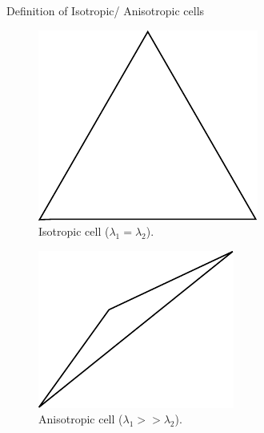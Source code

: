 \begin{frame}

  \begin{block}{Definition of Isotropic/ Anisotropic cells}
\begin{multicols}{2}
  \begin{figure}[H]
\includegraphics[scale=0.6]{image/isotropic_cell.pdf}
\caption{Isotropic cell  ($\lambda_1 = \lambda_2$).}
\end{figure}
\columnbreak
\begin{figure}
\includegraphics[scale=0.7]{image/anisotropic_cell.pdf}
\caption{Anisotropic cell ($\lambda_1 >> \lambda_2$).}
\end{figure}
\end{multicols}
\end{block}
\end{frame}


